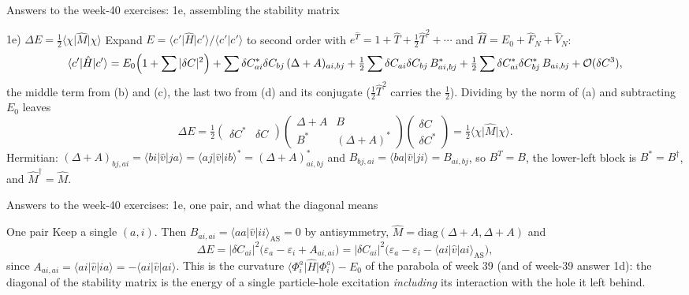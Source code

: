 \documentclass[aspectratio=169,10pt]{beamer}
\newcommand{\ket}[1]{\vert #1\rangle}
\newcommand{\bra}[1]{\langle #1\vert}
\newcommand{\braket}[2]{\langle #1\vert #2\rangle}
\newcommand{\element}[3]{\langle #1\vert #2\vert #3\rangle}
\newcommand{\bigO}{\mathcal{O}}
\begin{document}
\begin{frame}{Answers to the week-40 exercises: 1e, assembling the stability matrix}
  \footnotesize
  \begin{block}{1e) $\Delta E=\frac12\bra\chi\hat M\ket\chi$}
    Expand $E=\element{c'}{\hat H}{c'}/\braket{c'}{c'}$ to second order with $e^{\hat T}=1+\hat T+\frac12\hat T^2+\cdots$ and $\hat H=E_0+\hat F_N+\hat V_N$:
    \[
      \element{c'}{\hat H}{c'}=E_0\Bigl(1+\sum|\delta C|^2\Bigr)
      +\sum\delta C^{*}_{ai}\delta C_{bj}\,(\Delta+A)_{ai,bj}
      +\tfrac12\sum\delta C_{ai}\delta C_{bj}\,B^{*}_{ai,bj}
      +\tfrac12\sum\delta C^{*}_{ai}\delta C^{*}_{bj}\,B_{ai,bj}+\bigO(\delta C^3),
    \]
    the middle term from (b) and (c), the last two from (d) and its conjugate ($\frac12\hat T^2$ carries the $\frac12$). Dividing by the norm of (a) and subtracting $E_0$ leaves
    \[
      \Delta E=\tfrac12\begin{pmatrix}\delta C^{*}&\delta C\end{pmatrix}
      \begin{pmatrix}\Delta+A&B\\B^{*}&(\Delta+A)^{*}\end{pmatrix}
      \begin{pmatrix}\delta C\\\delta C^{*}\end{pmatrix}
      =\tfrac12\bra\chi\hat M\ket\chi .
    \]
    Hermitian: $(\Delta+A)_{bj,ai}=\element{bi}{\hat v}{ja}=\element{aj}{\hat v}{ib}^{*}=(\Delta+A)^{*}_{ai,bj}$ and $B_{bj,ai}=\element{ba}{\hat v}{ji}=B_{ai,bj}$, so $B^{T}=B$, the lower-left block is $B^{*}=B^{\dagger}$, and $\hat M^{\dagger}=\hat M$.
  \end{block}
\end{frame}

\begin{frame}{Answers to the week-40 exercises: 1e, one pair, and what the diagonal means}
  \footnotesize
  \begin{block}{One pair}
    Keep a single $(a,i)$. Then $B_{ai,ai}=\element{aa}{\hat v}{ii}_{\mathrm{AS}}=0$ by antisymmetry, $\hat M=\mathrm{diag}(\Delta+A,\Delta+A)$ and
    \[
      \Delta E=|\delta C_{ai}|^2\bigl(\varepsilon_a-\varepsilon_i+A_{ai,ai}\bigr)
      =|\delta C_{ai}|^2\bigl(\varepsilon_a-\varepsilon_i-\element{ai}{\hat v}{ai}_{\mathrm{AS}}\bigr),
    \]
    since $A_{ai,ai}=\element{ai}{\hat v}{ia}=-\element{ai}{\hat v}{ai}$. This is the curvature $\element{\Phi_i^a}{\hat H}{\Phi_i^a}-E_0$ of the parabola of week 39 (and of week-39 answer 1d): the diagonal of the stability matrix is the energy of a single particle-hole excitation \emph{including} its interaction with the hole it left behind.
  \end{block}
\end{frame}
\end{document}
